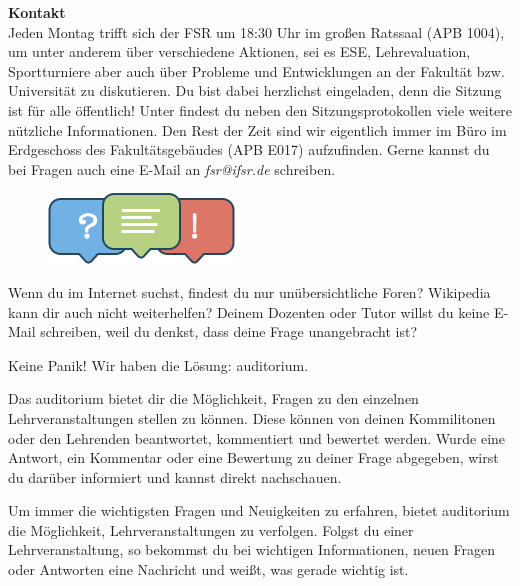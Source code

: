 \textbf{Kontakt} \\
Jeden Montag trifft sich der FSR um 18:30 Uhr im großen Ratssaal (APB 1004), um unter anderem über verschiedene Aktionen, sei es ESE, Lehrevaluation, Sportturniere aber auch über Probleme und Entwicklungen an der Fakultät bzw. Universität zu diskutieren.
Du bist dabei herzlichst eingeladen, denn die Sitzung ist für alle öffentlich! Unter  findest du neben den Sitzungsprotokollen viele weitere nützliche Informationen.
Den Rest der Zeit sind wir eigentlich immer im Büro im Erdgeschoss des Fakultätsgebäudes (APB E017) aufzufinden.
Gerne kannst du bei Fragen auch eine E-Mail an \textit{fsr@ifsr.de} schreiben.


\begin{figure}
\includegraphics[width=.95\linewidth]{img/auditorium_logo}
\end{figure}

Wenn du im Internet suchst, findest du nur unübersichtliche Foren?
Wikipedia kann dir auch nicht weiterhelfen?
Deinem Dozenten oder Tutor willst du keine E-Mail schreiben, weil du denkst, dass deine Frage unangebracht ist?

Keine Panik!
Wir haben die Lösung: auditorium.

Das auditorium  bietet dir die Möglichkeit, Fragen zu den einzelnen Lehrveranstaltungen stellen zu können.
Diese können von deinen Kommilitonen oder den Lehrenden beantwortet, kommentiert und bewertet werden.
Wurde eine Antwort, ein Kommentar oder eine Bewertung zu deiner Frage abgegeben, wirst du darüber informiert und kannst direkt nachschauen.

Um immer die wichtigsten Fragen und Neuigkeiten zu erfahren, bietet auditorium die Möglichkeit, Lehrveranstaltungen zu verfolgen.
Folgst du einer Lehrveranstaltung, so bekommst du bei wichtigen Informationen, neuen Fragen oder Antworten eine Nachricht und weißt, was gerade wichtig ist.

